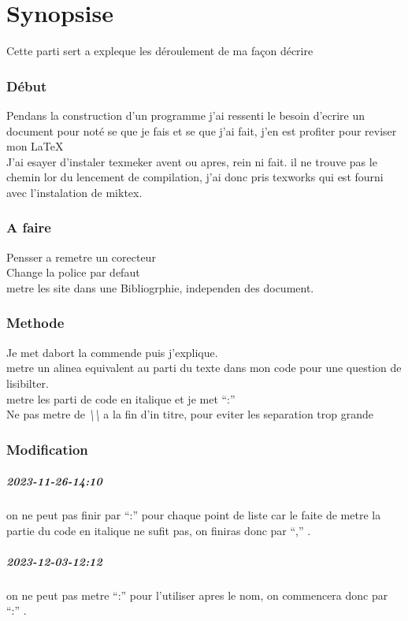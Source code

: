 \documentclass[a4paper,12pt]{report}
\begin{document}
	\section{Synopsise}
		Cette parti sert a expleque les déroulement de ma façon décrire\\
			\subsubsection{Début}
				Pendans la construction d'un programme j'ai ressenti le besoin d'ecrire un document pour noté se que je fais et se que j'ai fait, j'en est profiter pour reviser mon \LaTeX\\
				J'ai esayer d'instaler texmeker avent ou apres, rein ni fait. il ne trouve pas le chemin lor du lencement de compilation, j'ai donc pris texworks qui est fourni avec l'instalation de miktex.
			\subsubsection{A faire} 
				Pensser a remetre un corecteur \\
				Change la police par defaut\\
				metre les site dans une Bibliogrphie, independen des document.
			\subsubsection{Methode}
				Je met dabort la commende puis j'explique.\\
				metre un alinea equivalent au parti du texte dans mon code pour une question de lisibilter.\\
				metre les parti de code en italique et je met \enquote{:}\\
				Ne pas metre de \textit{\textbackslash\textbackslash} a la fin  d'in titre, pour eviter les separation trop grande
			\subsubsection{Modification}
					\subparagraph{2023-11-26-14:10} on ne peut pas finir par \enquote{:} pour chaque point de liste car le faite de metre la partie du code en italique ne sufit pas, on finiras donc par \enquote{,} .\\
					\subparagraph{2023-12-03-12:12} on ne peut pas metre \enquote{:} pour l'utiliser apres le nom, on commencera donc par \enquote{:} .

%	
%	
\end{document}
